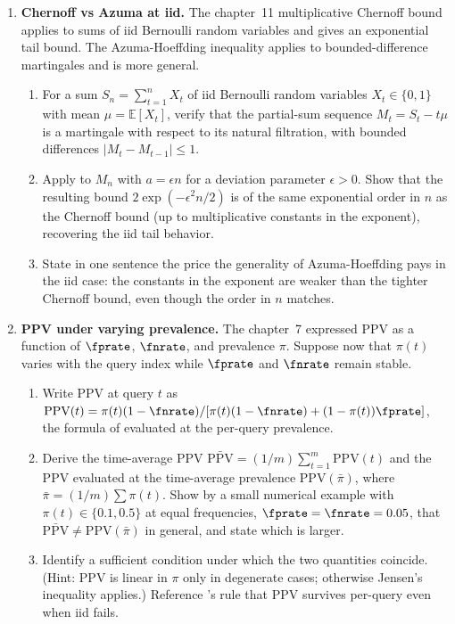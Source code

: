 \begin{enumerate}
\item \exstarstar
\label{ex:ch16-7}
\textbf{Chernoff vs Azuma at iid.}
The chapter~11 multiplicative Chernoff bound 
applies to sums of iid Bernoulli random variables and gives an
exponential tail bound. The Azuma-Hoeffding inequality
 applies to bounded-difference
martingales and is more general.
\begin{enumerate}
  \item[(a)] For a sum $S_n = \sum_{t = 1}^{n} X_t$ of iid Bernoulli
    random variables $X_t \in \{0, 1\}$ with mean $\mu = \mathbb{E}[X_t]$,
    verify that the partial-sum sequence $M_t = S_t - t \mu$ is a
    martingale with respect to its natural filtration, with bounded
    differences $|M_t - M_{t-1}| \le 1$.
  \item[(b)] Apply  to $M_n$ with $a =
    \epsilon n$ for a deviation parameter $\epsilon > 0$. Show that
    the resulting bound $2 \exp(-\epsilon^2 n / 2)$ is of the same
    exponential order in $n$ as the Chernoff bound (up to
    multiplicative constants in the exponent), recovering the iid
    tail behavior.
  \item[(c)] State in one sentence the price the generality of
    Azuma-Hoeffding pays in the iid case: the constants in the
    exponent are weaker than the tighter Chernoff bound, even
    though the order in $n$ matches.
\end{enumerate}

\item \exstarstar
\label{ex:ch16-8}
\textbf{PPV under varying prevalence.}
The chapter~7  expressed PPV as a function of
$\fprate$, $\fnrate$, and prevalence $\pi$. Suppose now that
$\pi(t)$ varies with the query index while $\fprate$ and
$\fnrate$ remain stable.
\begin{enumerate}
  \item[(a)] Write PPV at query $t$ as $\mathrm{PPV}(t) = \pi(t)
    (1 - \fnrate) / [\pi(t)(1 - \fnrate) + (1 - \pi(t)) \fprate]$,
    the formula of  evaluated at the per-query
    prevalence.
  \item[(b)] Derive the time-average PPV $\bar{\mathrm{PPV}} =
    (1 / m) \sum_{t = 1}^{m} \mathrm{PPV}(t)$ and the PPV
    evaluated at the time-average prevalence $\mathrm{PPV}(\bar\pi)$,
    where $\bar\pi = (1 / m) \sum \pi(t)$. Show by a small numerical
    example with $\pi(t) \in \{0.1, 0.5\}$ at equal frequencies,
    $\fprate = \fnrate = 0.05$, that $\bar{\mathrm{PPV}} \ne
    \mathrm{PPV}(\bar\pi)$ in general, and state which is larger.
  \item[(c)] Identify a sufficient condition under which the two
    quantities coincide. (Hint: PPV is linear in $\pi$ only in
    degenerate cases; otherwise Jensen's inequality applies.)
    Reference 's rule that PPV
    survives per-query even when iid fails.
\end{enumerate}


\end{enumerate}
